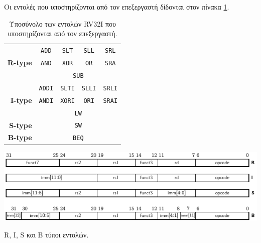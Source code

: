 Οι εντολές που υποστηρίζονται από τον επεξεργαστή δίδονται στον πίνακα \ref{table:instructions}.
\begin{table}[H]
	\begin{center}
		\begin{tabular}{|r|c|c|c|c|}
			\hline
			\multirow[|r|]{3}{*}{\textbf{R-type}} & \texttt{ADD}                      & \texttt{SLT}  & \texttt{SLL}  & \texttt{SRL}  \\\cline{2-5}
			                                      & \texttt{AND}                      & \texttt{XOR}  & \texttt{OR}   & \texttt{SRA}  \\\cline{2-5}
			                                      & \multicolumn{4}{c|}{\texttt{SUB}}                                                 \\\hline\hline
			\multirow[|r|]{3}{*}{\textbf{I-type}} & \texttt{ADDI}                     & \texttt{SLTI} & \texttt{SLLI} & \texttt{SRLI} \\\cline{2-5}
			                                      & \texttt{ANDI}                     & \texttt{XORI} & \texttt{ORI}  & \texttt{SRAI} \\\cline{2-5}
			                                      & \multicolumn{4}{c|}{\texttt{LW}}                                                  \\\hline\hline
			\textbf{S-type}                       & \multicolumn{4}{c|}{\texttt{SW}}                                                  \\\hline\hline
			\textbf{B-type}                       & \multicolumn{4}{c|}{\texttt{BEQ}}                                                 \\\hline
		\end{tabular}
		\caption{Υποσύνολο των εντολών RV32I που υποστηρίζονται από τον επεξεργαστή.}
		\label{table:instructions}
	\end{center}
\end{table}

\begin{circuitfig}[H]
	\centering
	\includegraphics[width=\linewidth]{schematics/instructions.pdf}
	\caption{R, I, S και B τύποι εντολών\cite{riscv}.}
	\label{schematic:instructions}
\end{circuitfig}

